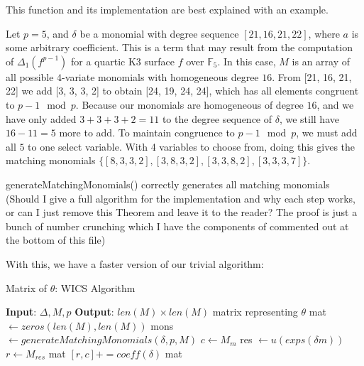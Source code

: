 This function and its implementation are best explained with an example.

\begin{ex}
    Let $p = 5$, and $\delta$ be a monomial with degree sequence $[21, 16, 21, 22]$, where $a$ is some arbitrary coefficient. This is a term that may
    result from the computation of $\Delta_1(f^{p - 1})$ for a quartic K3 surface $f$ over $\mathbb{F}_5$. In this case, $M$ is an array
    of all possible $4$-variate monomials with homogeneous degree $16$. From [21, 16, 21, 22] we add [3, 3, 3, 2] to obtain [24, 19, 24, 24], which
    has all elements congruent to $p-1 \mod p$. Because our monomials are homogeneous of degree $16$, and
    we have only added $3 + 3 + 3 + 2 = 11$ to the degree sequence of $\delta$, we still have $16 - 11 = 5$ more to add.
    To maintain congruence to $p-1 \mod p$, we must add all $5$ to one select variable. With 4 variables to choose from, doing this gives the
    matching monomials $\{[8, 3, 3, 2], [3, 8, 3, 2], [3, 3, 8, 2], [3, 3, 3, 7]\}$.
\end{ex}

\begin{thm}
    generateMatchingMonomials() correctly generates all matching monomials (Should I give a full algorithm for the implementation and why each step works, or can I just remove this Theorem and leave it to the reader? The proof is just a bunch of number crunching which I have the components of commented out at the bottom of this file)
\end{thm}

With this, we have a faster version of our trivial algorithm:

\begin{algorithm}[H]
    \caption{Matrix of $\theta$: WICS Algorithm}
    \label{alg:matrix:WICS}
    \begin{algorithmic}[1]
    \State \textbf{Input}: $\Delta, M, p$
    \State \textbf{Output}: $len(M) \times len(M)$ matrix representing $\theta$
    \State mat $\gets zeros(len(M), len(M))$
    \For{$\delta \in \Delta$}
        \State mons $\gets generateMatchingMonomials(\delta, p, M)$
            \State $c \gets M_m$
            \State res $\gets u(exps(\delta m))$
            \State $r \gets M_{res}$
            \State mat $[r, c] += coeff(\delta)$
        \EndFor
    \EndFor
    \State \Return mat
    \end{algorithmic}
\end{algorithm}

